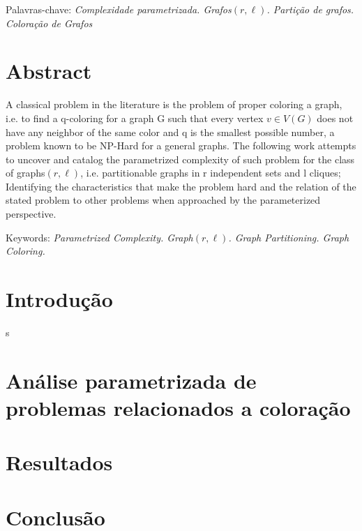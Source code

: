 \documentclass[a4paper,oneside,12pt]{book}
\begin{document}
\bigskip
%

\noindent Palavras-chave: \textit{Complexidade parametrizada. Grafos$(r,\ell)$. Partição de grafos. Coloração de Grafos}



\chapter*{Abstract}

\thispagestyle{myheadings}
\nocite{*}

A classical problem in the literature is the problem of proper coloring a graph, i.e. to find a q-coloring for a graph G such that every vertex $ v \in V (G) $ does not have any neighbor of the same color and q is the smallest possible number, a problem known to be NP-Hard for a general graphs. The following work attempts to uncover and catalog the parametrized complexity of such problem for the class of graphs$(r, \ell)$, i.e. partitionable graphs in r independent sets and l cliques; Identifying the characteristics that make the problem hard and the relation of the stated problem to other problems when approached by the parameterized perspective.

\bigskip
%

\noindent Keywords: \textit{Parametrized Complexity. Graph$(r,\ell)$. Graph Partitioning. Graph Coloring. }

\tableofcontents

\thispagestyle{myheadings}

\listoffigures
{}

\thispagestyle{myheadings}

\listoftables
{}

\thispagestyle{myheadings}

\pagebreak
{}

\chapter{Introdução} \label{cap:introducao}s


\chapter{Análise parametrizada de problemas relacionados a coloração}
\chapter{Resultados}
\chapter{Conclusão}

\cleardoublepage
{}
\end{document}

